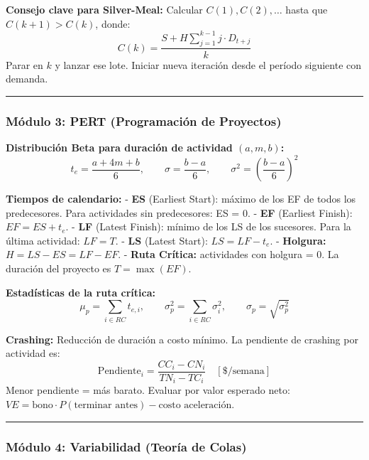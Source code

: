 \documentclass[
]{article}
\begin{document}
\textbf{Consejo clave para Silver-Meal:} Calcular \(C(1), C(2), \ldots\)
hasta que \(C(k+1) > C(k)\), donde:
\[C(k) = \frac{S + H \sum_{j=1}^{k-1} j \cdot D_{t+j}}{k}\] Parar en
\(k\) y lanzar ese lote. Iniciar nueva iteración desde el período
siguiente con demanda.

\begin{center}\rule{0.5\linewidth}{0.5pt}\end{center}

\hypertarget{muxf3dulo-3-pert-programaciuxf3n-de-proyectos}{%
\subsubsection{Módulo 3: PERT (Programación de
Proyectos)}\label{muxf3dulo-3-pert-programaciuxf3n-de-proyectos}}

\textbf{Distribución Beta para duración de actividad \((a, m, b)\):}
\[t_e = \frac{a + 4m + b}{6}, \qquad \sigma = \frac{b - a}{6}, \qquad \sigma^2 = \left(\frac{b-a}{6}\right)^2\]

\textbf{Tiempos de calendario:} - \textbf{ES} (Earliest Start): máximo
de los EF de todos los predecesores. Para actividades sin predecesores:
ES = 0. - \textbf{EF} (Earliest Finish): \(EF = ES + t_e\). -
\textbf{LF} (Latest Finish): mínimo de los LS de los sucesores. Para la
última actividad: \(LF = T\). - \textbf{LS} (Latest Start):
\(LS = LF - t_e\). - \textbf{Holgura:} \(H = LS - ES = LF - EF\). -
\textbf{Ruta Crítica:} actividades con holgura = 0. La duración del
proyecto es \(T = \max(EF)\).

\textbf{Estadísticas de la ruta crítica:}
\[\mu_p = \sum_{i \in RC} t_{e,i}, \qquad \sigma_p^2 = \sum_{i \in RC} \sigma_i^2, \qquad \sigma_p = \sqrt{\sigma_p^2}\]

\textbf{Crashing:} Reducción de duración a costo mínimo. La pendiente de
crashing por actividad es:
\[\text{Pendiente}_i = \frac{CC_i - CN_i}{TN_i - TC_i} \quad [\$/\text{semana}]\]
Menor pendiente = más barato. Evaluar por valor esperado neto:
\(VE = \text{bono} \cdot P(\text{terminar antes}) - \text{costo aceleración}\).

\begin{center}\rule{0.5\linewidth}{0.5pt}\end{center}

\hypertarget{muxf3dulo-4-variabilidad-teoruxeda-de-colas}{%
\subsubsection{Módulo 4: Variabilidad (Teoría de
Colas)}\label{muxf3dulo-4-variabilidad-teoruxeda-de-colas}}
\end{document}
